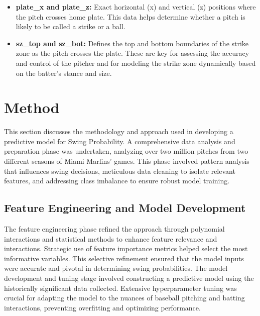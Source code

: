 \documentclass[12pt]{article}
\begin{document}
\begin{itemize}
\begin{itemize}
        \item \textbf{plate\_x and plate\_z:} Exact horizontal (x) and vertical (z) positions where the pitch crosses home plate. This data helps determine whether a pitch is likely to be called a strike or a ball.
        \item \textbf{sz\_top and sz\_bot:} Defines the top and bottom boundaries of the strike zone as the pitch crosses the plate. These are key for assessing the accuracy and control of the pitcher and for modeling the strike zone dynamically based on the batter’s stance and size.
    \end{itemize}
    
\end{itemize}

\maketitle

\section{Method}

This section discusses the methodology and approach used in developing a predictive model for Swing Probability. A comprehensive data analysis and preparation phase was undertaken, analyzing over two million pitches from two different seasons of Miami Marlins' games. This phase involved pattern analysis that influences swing decisions, meticulous data cleaning to isolate relevant features, and addressing class imbalance to ensure robust model training.

\subsection{Feature Engineering and Model Development}
The feature engineering phase refined the approach through polynomial interactions and statistical methods to enhance feature relevance and interactions. Strategic use of feature importance metrics helped select the most informative variables. This selective refinement ensured that the model inputs were accurate and pivotal in determining swing probabilities. The model development and tuning stage involved constructing a predictive model using the historically significant data collected. Extensive hyperparameter tuning was crucial for adapting the model to the nuances of baseball pitching and batting interactions, preventing overfitting and optimizing performance.
\end{document}
